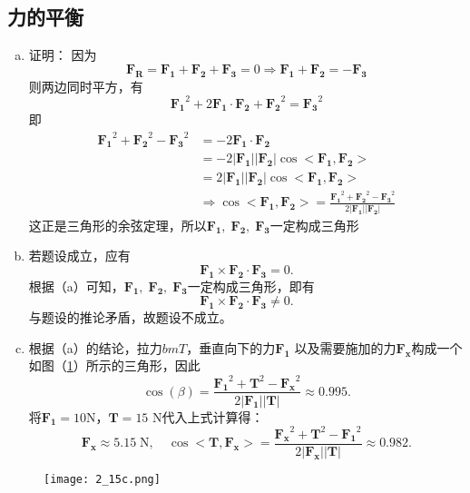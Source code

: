 \subsection{力的平衡}
\begin{enumerate}[(a)]
	\item
	证明：
	因为
	\[
	\bm{F_R} = \bm{F_1} + \bm{F_2} + \bm{F_3} = 0 \Rightarrow
	\bm{F_1} + \bm{F_2} = -\bm{F_3}
	\]
	则两边同时平方，有
	\[
	\bm{F_1}^2 + 2\bm{F_1} \cdot \bm{F_2} + \bm{F_2}^2 = \bm{F_3}^2
	\]
	即
	\[
	\begin{aligned}
	\bm{F_1}^2  + \bm{F_2}^2 - \bm{F_3}^2
	&= - 2\bm{F_1} \cdot \bm{F_2} \\
	&= -2|\bm{F_1}| |\bm{F_2}|\cos<\bm{F_1},\bm{F_2}>  \\
	&= 2|\bm{F_1}| |\bm{F_2}|\cos<\bm{F_1},\bm{F_2}> \\
	&\Rightarrow \cos<\bm{F_1},\bm{F_2}> = \frac{\bm{F_1}^2  + \bm{F_2}^2 - \bm{F_3}^2}{2|\bm{F_1}| |\bm{F_2}|}
\end{aligned}
	\]
	这正是三角形的余弦定理，所以$\bm{F_1},\;\bm{F_2},\;\bm{F_3}$一定构成三角形
	\item
	若题设成立，应有
	\[
	\bm{F_1} \times \bm{F_2} \cdot \bm{F_3} = 0.
	\]
	根据（a）可知，$\bm{F_1},\;\bm{F_2},\;\bm{F_3}$一定构成三角形，即有
	\[
	\bm{F_1} \times \bm{F_2} \cdot \bm{F_3} \ne 0.
	\]
	与题设的推论矛盾，故题设不成立。
	\item
	根据（a）的结论，拉力$bm{T}$，垂直向下的力$\bm{F_{1}}$ 以及需要施加的力$\bm{F_{x}}$构成一个如图（\ref{2_15c}）所示的三角形，因此
	\[
	\cos(\beta) = \frac{\bm{F_1}^2  + \bm{T}^2 - \bm{F_x}^2}{2|\bm{F_1}| |\bm{T}|} \approx 0.995.
	\]
	将$ \bm{F_{1}} = 10 $N，$\bm{T} = 15$ N代入上式计算得：
	\[
	\bm{F_x} \approx 5.15\; \textrm{N},\quad
	\cos<\bm{T},\bm{F_x}> = \frac{\bm{F_x}^2  + \bm{T}^2 - \bm{F_1}^2}{2|\bm{F_x}| |\bm{T}|} \approx 0.982.
	\]
\end{enumerate}


\begin{figure}[htbp]
	\centering
	\texttt{[image: 2\_15c.png]}
	\caption{}
	\label{2_15c}
\end{figure}
